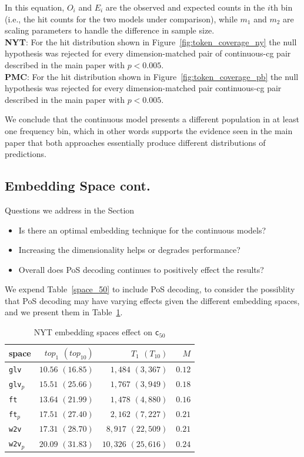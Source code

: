 \documentclass[11pt,a4paper]{article}
\begin{document}
In this equation, $O_i$ and $E_i$ are the observed and expected counts in the $i$th bin (i.e., the hit counts for the two models under comparison), while $m_1$ and $m_2$ are scaling parameters to handle the difference in sample size.\\
\textbf{NYT}: For the hit distribution shown in Figure~\ref{fig:token_coverage_ny} the null hypothesis was rejected for every dimension-matched pair of continuous-cg pair described in the main paper with $p<0.005$. \\
\textbf{PMC}: For the hit distribution shown in Figure~\ref{fig:token_coverage_pb} the null hypothesis was rejected for every dimension-matched pair continuous-cg pair described in the main paper with $p<0.005$.

We conclude that the continuous model presents a different population in at least one frequency bin, which in other words supports the evidence seen in the main paper that both approaches essentially produce different distributions of predictions.

\subsection{Embedding Space cont.}\label{embedding_apx}
Questions we address in the Section
\begin{itemize}
  \item Is there an optimal embedding technique for the continuous models? 
  \item Increasing the dimensionality helps or degrades performance?  \item Overall does PoS decoding continues to positively effect the results?
\end{itemize}

We expend Table~\ref{space_50} to include PoS decoding, to consider the possiblity that PoS decoding may have varying effects given the different embedding spaces, and we present them in Table~\ref{space_50_p}.

\begin{table}[h]
\begin{center}
\begin{tabular}{lrrr}
space &  $top_{1}$ $(top_{10})$ & $T_{1}$ $(T_{10})$ & $M$ \\ \hline
{\tt glv} & $10.56$ $(16.85)$ & $1,484$ $(3,367)$ & $0.12$  \\
{\tt glv}$_{p}$ & $15.51$ $(25.66)$ & $1,767$ $(3,949)$ & $0.18$\\
{\tt ft} & $13.64$ $(21.99)$ & $1,478$ $(4,880)$ & $0.16$ \\
{\tt ft}$_{p}$ & $17.51$ $(27.40)$ & $2,162$ $(7,227)$ & $0.21$\\
{\tt w2v} & $17.31$ $(28.70)$ & $8,917$ $(22,509)$ & $0.21$ \\
{\tt w2v}$_{p}$ & $20.09$ $(31.83)$ & $10,326$ $(25,616)$ & $0.24$\\
\end{tabular}
\end{center}
\caption{\label{space_50_p}{NYT embedding spaces effect on \tt c$_{50}$}}
\end{table}
\end{document}
